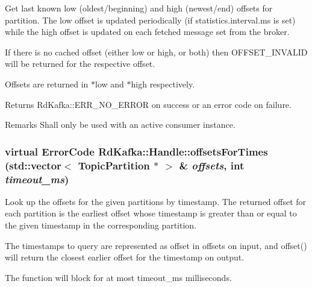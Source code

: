 Get last known low (oldest/beginning) and high (newest/end) offsets for partition. The low offset is updated periodically (if statistics.interval.ms is set) while the high offset is updated on each fetched message set from the broker.

If there is no cached offset (either low or high, or both) then OFFSET\_\-INVALID will be returned for the respective offset.

Offsets are returned in {\ttfamily $\ast$low} and {\ttfamily $\ast$high} respectively.

\begin{DoxyReturn}{Returns}
RdKafka::ERR\_\-NO\_\-ERROR on success or an error code on failure.
\end{DoxyReturn}
\begin{DoxyRemark}{Remarks}
Shall only be used with an active consumer instance. 
\end{DoxyRemark}
\hypertarget{classRdKafka_1_1Handle_a23ba69e53d3e4a9b3978ca91c205a65e}{
\subsubsection[{offsetsForTimes}]{\setlength{\rightskip}{0pt plus 5cm}virtual ErrorCode RdKafka::Handle::offsetsForTimes (std::vector$<$ {\bf TopicPartition} $\ast$ $>$ \& {\em offsets}, \/  int {\em timeout\_\-ms})}}
\label{classRdKafka_1_1Handle_a23ba69e53d3e4a9b3978ca91c205a65e}


Look up the offsets for the given partitions by timestamp. The returned offset for each partition is the earliest offset whose timestamp is greater than or equal to the given timestamp in the corresponding partition.

The timestamps to query are represented as {\ttfamily offset} in {\ttfamily offsets} on input, and {\ttfamily offset()} will return the closest earlier offset for the timestamp on output.

The function will block for at most {\ttfamily timeout\_\-ms} milliseconds.

